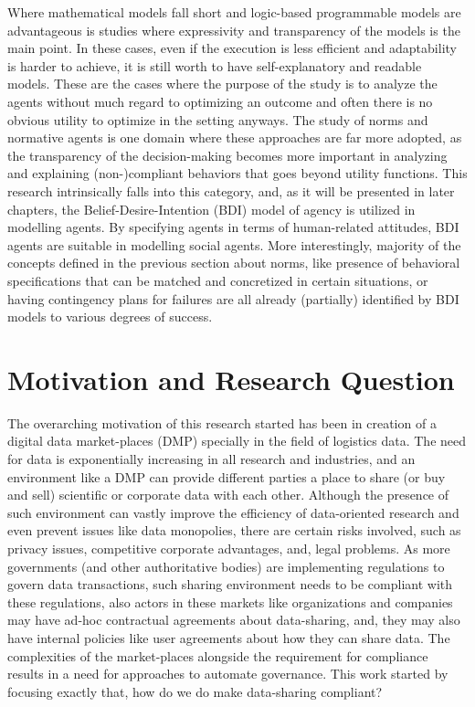 Where mathematical models fall short and logic-based programmable models are advantageous is studies where expressivity and transparency of the models is the main point. In these cases, even if the execution is less efficient and adaptability is harder to achieve, it is still worth to have self-explanatory and readable models. These are the cases where the purpose of the study is to analyze the agents without much regard to optimizing an outcome and often there is no obvious utility to optimize in the setting anyways. The study of norms and normative agents is one domain where these approaches are far more adopted, as the transparency of the decision-making becomes more important in analyzing and explaining (non-)compliant behaviors that goes beyond utility functions. This research intrinsically falls into this category, and, as it will be presented in later chapters, the Belief-Desire-Intention (BDI) model of agency \cite{Something} is utilized in modelling agents. By specifying agents in terms of human-related attitudes, BDI agents are suitable in modelling social agents. More interestingly, majority of the concepts defined in the previous section about norms, like presence of behavioral specifications that can be matched and concretized in certain situations, or having contingency plans for failures are all already (partially) identified by BDI models to various degrees of success.


\section{Motivation and Research Question}
The overarching motivation of this research started has been in creation of a digital data market-places (DMP) specially in the field of logistics data. The need for data is exponentially increasing in all research and industries, and an environment like a DMP can provide different parties a place to share (or buy and sell) scientific or corporate data with each other. Although the presence of such environment can vastly improve the efficiency of data-oriented research and even prevent issues like data monopolies, there are certain risks involved, such as privacy issues, competitive corporate advantages, and, legal problems. As more governments (and other authoritative bodies) are implementing regulations to govern data transactions, such sharing environment needs to be compliant with these regulations, also actors in these markets like organizations and companies may have ad-hoc contractual agreements about data-sharing, and, they may also have internal policies like user agreements about how they can share data. The complexities of the market-places alongside the requirement for compliance results in a need for approaches to automate governance. This work started by focusing exactly that, how do we do make data-sharing compliant? 


